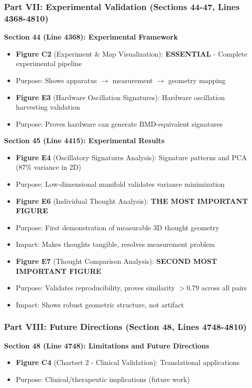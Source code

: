 \documentclass[11pt]{article}
\begin{document}
\subsubsection{Part VII: Experimental Validation (Sections 44-47, Lines 4368-4810)}

\textbf{Section 44 (Line 4368): Experimental Framework}
\begin{itemize}
\item \textbf{Figure C2} (Experiment \& Map Visualization): \textbf{ESSENTIAL} - Complete experimental pipeline
\item Purpose: Shows apparatus $\to$ measurement $\to$ geometry mapping
\item \textbf{Figure E3} (Hardware Oscillation Signatures): Hardware oscillation harvesting validation
\item Purpose: Proves hardware can generate BMD-equivalent signatures
\end{itemize}

\textbf{Section 45 (Line 4415): Experimental Results}
\begin{itemize}
\item \textbf{Figure E4} (Oscillatory Signatures Analysis): Signature patterns and PCA (87\% variance in 2D)
\item Purpose: Low-dimensional manifold validates variance minimization
\item \textbf{Figure E6} (Individual Thought Analysis): \textbf{THE MOST IMPORTANT FIGURE}
\item Purpose: First demonstration of measurable 3D thought geometry
\item Impact: Makes thoughts tangible, resolves measurement problem
\item \textbf{Figure E7} (Thought Comparison Analysis): \textbf{SECOND MOST IMPORTANT FIGURE}
\item Purpose: Validates reproducibility, proves similarity $> 0.79$ across all pairs
\item Impact: Shows robust geometric structure, not artifact
\end{itemize}

\subsubsection{Part VIII: Future Directions (Section 48, Lines 4748-4810)}

\textbf{Section 48 (Line 4748): Limitations and Future Directions}
\begin{itemize}
\item \textbf{Figure C4} (Chartset 2 - Clinical Validation): Translational applications
\item Purpose: Clinical/therapeutic implications (future work)
\end{itemize}
\end{document}
